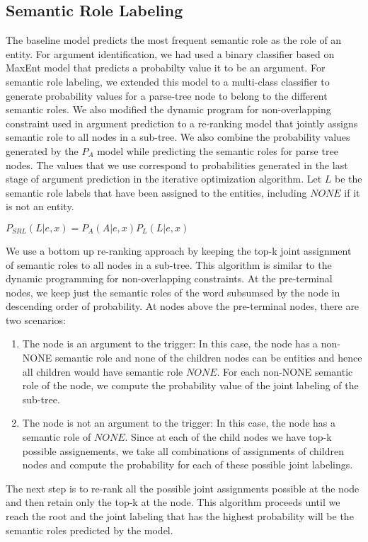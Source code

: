 \subsection{Semantic Role Labeling}
The baseline model predicts the most frequent semantic role as the role of an entity.
For argument identification, we had used a binary classifier based on MaxEnt model that predicts a probabilty value it to be an argument. For semantic role labeling, we extended this model to a multi-class classifier to generate probability values for a parse-tree node to belong to the different semantic roles. We also modified the dynamic program for non-overlapping constraint used in argument prediction to a re-ranking model that jointly assigns semantic role to all nodes in a sub-tree. We also combine the probability values generated by the $P_A$ model while predicting the semantic roles for parse tree nodes. The values that we use correspond to probabilities generated in the last stage of argument prediction in the iterative optimization algorithm. Let $L$ be the semantic role labels that have been assigned to the entities, including $NONE$ if it is not an entity.

$P_{SRL}(L| e, x) = P_A(A|e, x) P_L(L|e,x) $

We use a bottom up re-ranking approach by keeping the top-k joint assignment of semantic roles to all nodes in a sub-tree. This algorithm is similar to the dynamic programming for non-overlapping constraints. At the pre-terminal nodes, we keep just the semantic roles of the word subsumsed by the node in descending order of probability. At nodes above the pre-terminal nodes, there are two scenarios:

\begin{enumerate}
\item The node is an argument to the trigger: In this case, the node has a non-NONE semantic role and none of the children nodes can be entities and hence all children would have semantic role $NONE$. For each non-NONE semantic role of the node, we compute the probability value of the joint labeling of the sub-tree.
\item The node is not an argument to the trigger: In this case, the node has a semantic role of $NONE$. Since at each of the child nodes we have top-k possible assignements, we take all combinations of assignments of children nodes and compute the probability for each of these possible joint labelings.
\end{enumerate}

The next step is to re-rank all the possible joint assignments possible at the node and then retain only the top-k at the node. This algorithm proceeds until we reach the root and the joint labeling that has the highest probability will be the semantic roles predicted by the model.
